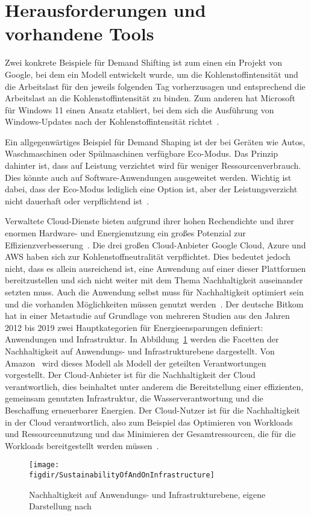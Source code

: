 \section{Herausforderungen und vorhandene Tools}
Zwei konkrete Beispiele für Demand Shifting ist zum einen ein Projekt von Google, bei dem ein Modell entwickelt wurde, um die Kohlenstoffintensität und die Arbeitslast für den jeweils folgenden Tag vorherzusagen und entsprechend die Arbeitslast an die Kohlenstoffintensität zu binden.
Zum anderen hat Microsoft für Windows 11 einen Ansatz etabliert, bei dem sich die Ausführung von Windows-Updates nach der Kohlenstoffintensität richtet~\cite{GreenSoftwareFoundation.2022}.

Ein allgegenwärtiges Beispiel für Demand Shaping ist der bei Geräten wie Autos, Waschmaschinen oder Spülmaschinen verfügbare Eco-Modus.
Das Prinzip dahinter ist, dass auf Leistung verzichtet wird für weniger Ressourcenverbrauch.
Dies könnte auch auf Software-Anwendungen ausgeweitet werden.
Wichtig ist dabei, dass der Eco-Modus lediglich eine Option ist, aber der Leistungsverzicht nicht dauerhaft oder verpflichtend ist~\cite{GreenSoftwareFoundation.2022}.

Verwaltete Cloud-Dienste bieten aufgrund ihrer hohen Rechendichte und ihrer enormen Hardware- und Energienutzung ein großes Potenzial zur Effizienzverbesserung~\cite{Currie.2024}.
Die drei großen Cloud-Anbieter Google Cloud, Azure und AWS haben sich zur Kohlenstoffneutralität verpflichtet.
Dies bedeutet jedoch nicht, dass es allein ausreichend ist, eine Anwendung auf einer dieser Plattformen bereitzustellen und sich nicht weiter mit dem Thema Nachhaltigkeit auseinander setzten muss.
Auch die Anwendung selbst muss für Nachhaltigkeit optimiert sein und die vorhanden Möglichkeiten müssen genutzt werden~\cite{Newman.2023}.
Der deutsche Bitkom hat in einer Metastudie auf Grundlage von mehreren Studien aus den Jahren 2012 bis 2019 zwei Hauptkategorien für Energieensparungen definiert: Anwendungen und Infrastruktur.
In Abbildung~\ref{FIG:sustainability-infrastructure} werden die Facetten der Nachhaltigkeit auf Anwendungs- und Infrastrukturebene dargestellt.
Von Amazon~\cite{Mokhtari.2023} wird dieses Modell als Modell der geteilten Verantwortungen vorgestellt.
Der Cloud-Anbieter ist für die Nachhaltigkeit der Cloud verantwortlich, dies beinhaltet unter anderem die Bereitstellung einer effizienten, gemeinsam genutzten Infrastruktur, die Wasserverantwortung und die Beschaffung erneuerbarer Energien.
Der Cloud-Nutzer ist für die Nachhaltigkeit in der Cloud verantwortlich, also zum Beispiel das Optimieren von Workloads und Ressourcennutzung und das Minimieren der Gesamtressourcen, die für die Workloads bereitgestellt werden müssen~\cite{Mokhtari.2023}.
\begin{figure}
 \caption{Nachhaltigkeit auf Anwendungs- und Infrastrukturebene, eigene Darstellung nach ~\cite{Mokhtari.2023}}
 {\texttt{[image: \\figdir/SustainabilityOfAndOnInfrastructure]}}
 \label{FIG:sustainability-infrastructure}
\end{figure}

